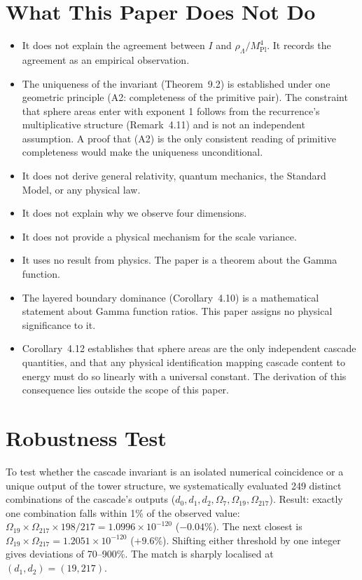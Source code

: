 \documentclass[11pt,a4paper]{article}
\begin{document}
\section{What This Paper Does Not Do}

\begin{itemize}
\item It does not explain the agreement between $I$ and $\rho_\Lambda/M^4_{\mathrm{Pl}}$. It records the agreement as an empirical observation.
\item The uniqueness of the invariant (Theorem~9.2) is established under one geometric principle (A2: completeness of the primitive pair). The constraint that sphere areas enter with exponent 1 follows from the recurrence's multiplicative structure (Remark~4.11) and is not an independent assumption. A proof that (A2) is the only consistent reading of primitive completeness would make the uniqueness unconditional.
\item It does not derive general relativity, quantum mechanics, the Standard Model, or any physical law.
\item It does not explain why we observe four dimensions.
\item It does not provide a physical mechanism for the scale variance.
\item It uses no result from physics. The paper is a theorem about the Gamma function.
\item The layered boundary dominance (Corollary~4.10) is a mathematical statement about Gamma function ratios. This paper assigns no physical significance to it.
\item Corollary~4.12 establishes that sphere areas are the only independent cascade quantities, and that any physical identification mapping cascade content to energy must do so linearly with a universal constant. The derivation of this consequence lies outside the scope of this paper.
\end{itemize}

\section{Robustness Test}

To test whether the cascade invariant is an isolated numerical coincidence or a unique output of the tower structure, we systematically evaluated 249 distinct combinations of the cascade's outputs ($d_0, d_1, d_2, \Omega_7, \Omega_{19}, \Omega_{217}$). Result: exactly one combination falls within 1\% of the observed value: $\Omega_{19}\times\Omega_{217}\times 198/217 = 1.0996\times 10^{-120}$ ($-0.04\%$). The next closest is $\Omega_{19}\times\Omega_{217} = 1.2051\times 10^{-120}$ ($+9.6\%$). Shifting either threshold by one integer gives deviations of 70--900\%. The match is sharply localised at $(d_1, d_2) = (19, 217)$.
\end{document}
